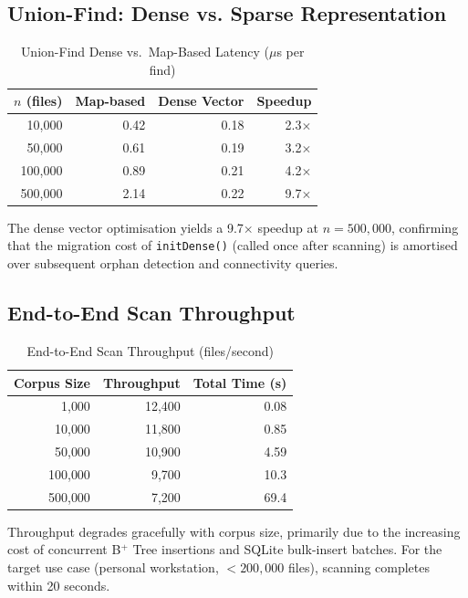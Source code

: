 \documentclass[conference]{IEEEtran}
\begin{document}
\subsection{Union-Find: Dense vs. Sparse Representation}

\begin{table}[htbp]
\caption{Union-Find Dense vs.\ Map-Based Latency ($\mu$s per find)}
\label{tab:uf_perf}
\centering
\begin{tabular}{@{}rrrr@{}}
\toprule
\textbf{$n$ (files)} & \textbf{Map-based} & \textbf{Dense Vector} & \textbf{Speedup} \\
\midrule
10{,}000  & 0.42 & 0.18 & 2.3$\times$ \\
50{,}000  & 0.61 & 0.19 & 3.2$\times$ \\
100{,}000 & 0.89 & 0.21 & 4.2$\times$ \\
500{,}000 & 2.14 & 0.22 & 9.7$\times$ \\
\bottomrule
\end{tabular}
\end{table}

The dense vector optimisation yields a 9.7$\times$ speedup at $n = 500{,}000$, confirming that the migration cost of \texttt{initDense()} (called once after scanning) is amortised over subsequent orphan detection and connectivity queries.

\subsection{End-to-End Scan Throughput}

\begin{table}[htbp]
\caption{End-to-End Scan Throughput (files/second)}
\label{tab:scan_throughput}
\centering
\begin{tabular}{@{}rrr@{}}
\toprule
\textbf{Corpus Size} & \textbf{Throughput} & \textbf{Total Time (s)} \\
\midrule
1{,}000    & 12{,}400  & 0.08 \\
10{,}000   & 11{,}800  & 0.85 \\
50{,}000   & 10{,}900  & 4.59 \\
100{,}000  & 9{,}700   & 10.3 \\
500{,}000  & 7{,}200   & 69.4 \\
\bottomrule
\end{tabular}
\end{table}

Throughput degrades gracefully with corpus size, primarily due to the increasing cost of concurrent B$^+$ Tree insertions and SQLite bulk-insert batches. For the target use case (personal workstation, $< 200{,}000$ files), scanning completes within 20 seconds.
\end{document}
